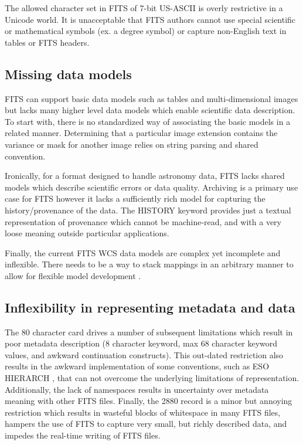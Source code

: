 \documentclass[11pt,twoside]{article}
\begin{document}
The allowed character set in FITS of 7-bit US-ASCII is overly restrictive in a
Unicode world. It is unacceptable that FITS authors cannot use special 
scientific or mathematical symbols (ex. a degree symbol) or capture 
non-English text in tables or FITS headers.

\subsection{Missing data models}

FITS can support basic data models such as tables and multi-dimensional 
images but lacks many higher level data models which enable scientific
data description. To start with, there is no standardized way of associating
the basic models in a related manner. Determining that a particular image 
extension contains the variance or mask for another image relies on string 
parsing and shared convention. 

Ironically, for a format designed to handle astronomy data, FITS lacks shared
models which describe scientific errors or data quality. Archiving is
a primary use case for FITS however it lacks a sufficiently rich model 
for capturing the history/provenance of the data.
The HISTORY keyword provides just a textual representation of
provenance which cannot be machine-read, and with a very loose 
meaning outside particular applications.

Finally, the current FITS WCS data models are complex yet incomplete and
inflexible. There needs to be a way to stack mappings in an arbitrary
manner to allow for flexible model development \citep[see
e.g.][]{1998ASPC..145...41W,2012ASPC..461..825B,O35_adassxxii}.


\subsection{Inflexibility in representing metadata and data}

The 80 character card drives a number of subsequent limitations which
result in poor metadata description (8 character keyword, max 68 character
keyword values, and awkward continuation constructs). 
This out-dated restriction also results in the awkward implementation 
of some conventions, such as ESO HIERARCH \citep{2009Wic}, that can not 
overcome the underlying limitations of representation. Additionally, 
the lack of namespaces results in uncertainty over metadata meaning with 
other FITS files. Finally, the 2880 record is a minor but annoying 
restriction which results in wasteful blocks of whitespace in many 
FITS files, hampers the use of FITS to capture very small, but 
richly described data, and impedes the real-time writing of FITS files.
\end{document}

